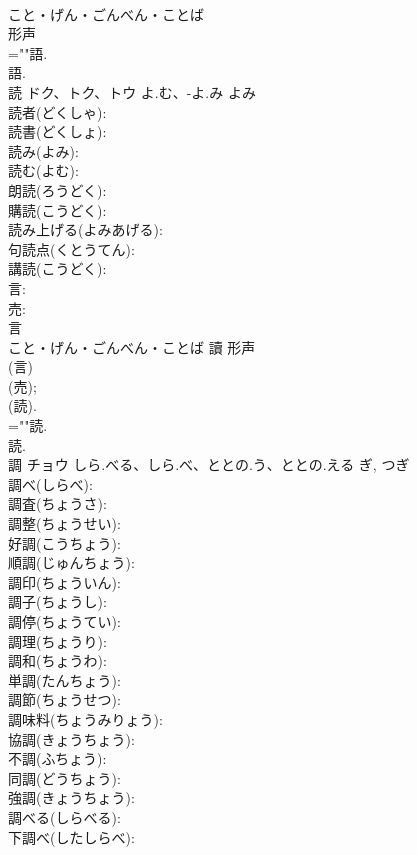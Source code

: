 \documentclass[8pt]{extreport}
\begin{document}
\begin{CJK}{UTF8}{min}
\\	こと・げん・ごんべん・ことば	
\\	形声 
\\	=""語.
\\	語.
\\	読	ドク、トク、トウ	よ.む、-よ.み	よみ	
\\	読者(どくしゃ): 
\\	読書(どくしょ): 
\\	読み(よみ): 
\\	読む(よむ): 
\\	朗読(ろうどく): 
\\	購読(こうどく): 
\\	読み上げる(よみあげる): 
\\	句読点(くとうてん): 
\\	講読(こうどく): 
\\	言: 
\\	売: 
\\	言	
\\	こと・げん・ごんべん・ことば	讀	形声 
\\	(言) 
\\	(売); 
\\	(読).	
\\	=""読.
\\	読.
\\	調	チョウ	しら.べる、しら.べ、ととの.う、ととの.える	ぎ, つぎ	
\\	調べ(しらべ): 
\\	調査(ちょうさ): 
\\	調整(ちょうせい): 
\\	好調(こうちょう): 
\\	順調(じゅんちょう): 
\\	調印(ちょういん): 
\\	調子(ちょうし): 
\\	調停(ちょうてい): 
\\	調理(ちょうり): 
\\	調和(ちょうわ): 
\\	単調(たんちょう): 
\\	調節(ちょうせつ): 
\\	調味料(ちょうみりょう): 
\\	協調(きょうちょう): 
\\	不調(ふちょう): 
\\	同調(どうちょう): 
\\	強調(きょうちょう): 
\\	調べる(しらべる): 
\\	下調べ(したしらべ): 

\end{CJK}
\end{document}
